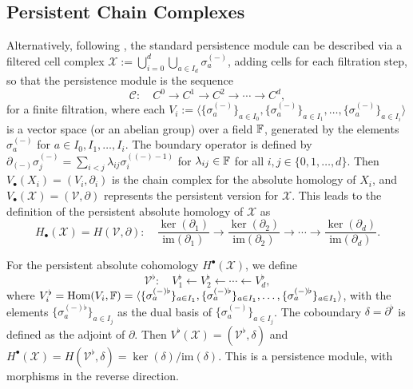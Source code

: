 \subsection{Persistent Chain Complexes}
Alternatively, following \cite[\S 2.6]{de2011dualities}, the standard persistence module
can be described via a filtered cell complex $\mathcal{X}:= \bigcup_{i=0}^{d}\bigcup_{a \in I_d} \sigma_a^{(-)}$, adding cells for each filtration step, so that the persistence module is the sequence
\[
	\mathcal{C}: \quad C^{0} \to C^{1} \to C^{2} \to \cdots \to C^{d},
\]
for a finite filtration, where each $V_{i} := \langle \{\sigma^{(-)}_a\}_{a \in I_0}, \{\sigma^{(-)}_a\}_{a \in I_1}, \ldots, \{\sigma^{(-)}_a\}_{a \in I_i}
\rangle$ is a vector space (or an abelian group) over a field ${\mathbb{F}}$,
generated by the elements $\sigma^{(-)}_a$ for $a \in I_0, I_1, \ldots, I_i$. The boundary operator
is defined by $\partial_{(-)} \sigma^{(-)}_{j} = \sum_{i<j}\lambda_{ij}\sigma^{((-)-1)}_{i}$ for $\lambda
_{ij}\in {\mathbb{F}}$ for all $i, j \in \{0, 1, \ldots, d\}$. Then $V_{\bullet}(X_{i}) = (V_{i},\partial_{i})$ is the chain complex for the absolute
homology of $X_{i}$, and $V_{\bullet}(\mathcal{X}) = (\mathcal{V},\partial)$
represents the persistent version for $\mathcal{X}$. This leads to the definition
of the persistent absolute homology of $\mathcal{X}$ as
\[
	H_{\bullet}(\mathcal{X}) = H(\mathcal{V}, \partial): \quad \frac{\ker(\partial_{1})}{\text{im}(\partial_{1})}
	\to \frac{\ker(\partial_{2})}{\text{im}(\partial_{2})}\to \cdots \to \frac{\ker(\partial_{d})}{\text{im}(\partial_{d})}
	.
\]

For the persistent absolute cohomology $H^{\bullet}(\mathcal{X})$, we define
\[
	\mathcal{V}^{\flat}: \quad V^{\flat}_{1} \leftarrow V^{\flat}_{2} \leftarrow \cdots
	\leftarrow V^{\flat}_{d},
\]
where $V_{i}^{\flat} = \text{Hom}(V_{i}, {\mathbb{F}}) = \langle \{\sigma^{(-)\flat}_a\}_{a \in I_1}, \{\sigma^{(-)\flat}_a\}_{a \in I_1}, \ldots, \{\sigma^{(-)\flat}_a\}_{a \in I_1} \rangle$, with the elements
$\{\sigma^{(-)\flat}_a\}_{a\in I_j}$ as the dual basis of $\{\sigma^{(-)}_a\}_{a \in I_j}$. The coboundary $\delta
= \partial^{\flat}$ is defined as the adjoint of $\partial$. Then
$V^{\flat}(\mathcal{X}) = (\mathcal{V}^{\flat}, \delta)$ and
$H^{\bullet}(\mathcal{X}) = H(\mathcal{V}^{\flat}, \delta) = \ker(\delta) / \text{im}
(\delta)$. This is a persistence module, with morphisms in the
reverse direction.

